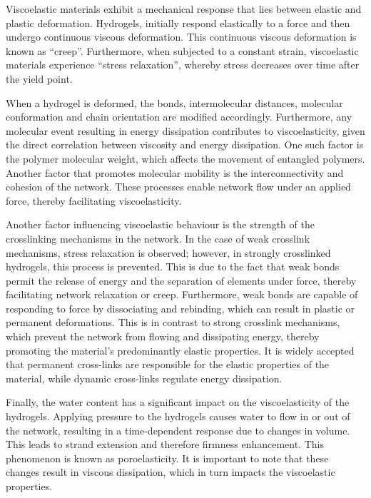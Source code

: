 Viscoelastic materials exhibit a mechanical response that lies between elastic and plastic deformation.
Hydrogels, initially respond elastically to a force and then undergo continuous viscous deformation.
This continuous viscous deformation is known as ``creep''.
Furthermore, when subjected to a constant strain, viscoelastic materials experience ``stress relaxation'', whereby stress decreases over time after the yield point.

When a hydrogel is deformed, the bonds, intermolecular distances, molecular conformation and chain orientation are modified accordingly.
Furthermore, any molecular event resulting in energy dissipation contributes to viscoelasticity, given the direct correlation between viscosity and energy dissipation.
One such factor is the polymer molecular weight, which affects the movement of entangled polymers.
Another factor that promotes molecular mobility is the interconnectivity and cohesion of the network.
These processes enable network flow under an applied force, thereby facilitating viscoelasticity.

Another factor influencing viscoelastic behaviour is the strength of the crosslinking mechanisms in the network.
In the case of weak crosslink mechanisms, stress relaxation is observed; however, in strongly crosslinked hydrogels, this process is prevented. 
This is due to the fact that weak bonds permit the release of energy and the separation of elements under force, thereby facilitating network relaxation or creep.
Furthermore, weak bonds are capable of responding to force by dissociating and rebinding, which can result in plastic or permanent deformations.
This is in contrast to strong crosslink mechanisms, which prevent the network from flowing and dissipating energy, thereby promoting the material's predominantly elastic properties.
It is widely accepted that permanent cross-links are responsible for the elastic properties of the material, while dynamic cross-links regulate energy dissipation.

Finally, the water content has a significant impact on the viscoelasticity of the hydrogels.
Applying pressure to the hydrogels causes water to flow in or out of the network, resulting in a time-dependent response due to changes in volume. This leads to strand extension and therefore firmness enhancement.
This phenomenon is known as poroelasticity. 
It is important to note that these changes result in viscous dissipation, which in turn impacts the viscoelastic properties\citep{sheikoArchitecturalCodeRubber2019,courbotRoleExtracellularMatrix2025}.

